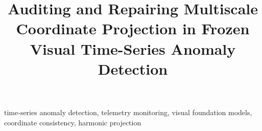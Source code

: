 \documentclass[conference]{IEEEtran}
\begin{document}
\title{Auditing and Repairing Multiscale Coordinate Projection in Frozen Visual Time-Series Anomaly Detection}

\author{}

\maketitle

\begin{abstract}

\end{abstract}

\begin{IEEEkeywords}
time-series anomaly detection, telemetry monitoring, visual foundation models,
coordinate consistency, harmonic projection
\end{IEEEkeywords}










\end{document}
